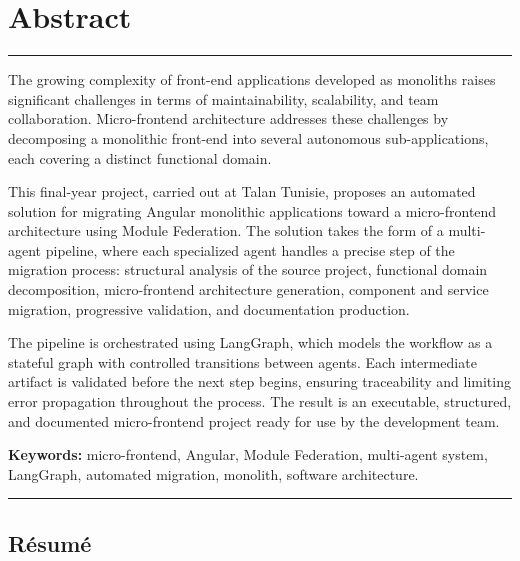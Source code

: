 \chapter*{Abstract}

\noindent\rule{\linewidth}{1pt}
\vspace{0.3cm}

\noindent The growing complexity of front-end applications developed as monoliths raises significant challenges in terms of maintainability, scalability, and team collaboration. Micro-frontend architecture addresses these challenges by decomposing a monolithic front-end into several autonomous sub-applications, each covering a distinct functional domain.

\medskip

\noindent This final-year project, carried out at Talan Tunisie, proposes an automated solution for migrating Angular monolithic applications toward a micro-frontend architecture using Module Federation. The solution takes the form of a multi-agent pipeline, where each specialized agent handles a precise step of the migration process: structural analysis of the source project, functional domain decomposition, micro-frontend architecture generation, component and service migration, progressive validation, and documentation production.

\medskip

\noindent The pipeline is orchestrated using LangGraph, which models the workflow as a stateful graph with controlled transitions between agents. Each intermediate artifact is validated before the next step begins, ensuring traceability and limiting error propagation throughout the process. The result is an executable, structured, and documented micro-frontend project ready for use by the development team.

\vspace{0.5cm}

\noindent\textbf{Keywords:} micro-frontend, Angular, Module Federation, multi-agent system, LangGraph, automated migration, monolith, software architecture.

\vspace{0.4cm}
\noindent\rule{\linewidth}{1pt}

\newpage

\section*{Résumé}

